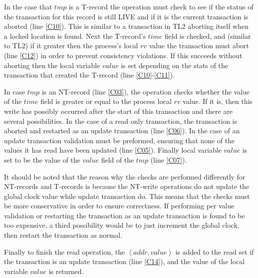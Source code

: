 \documentclass[runningheads,a4paper]{llncs}
\newcommand{\tuple}[1]{\ensuremath{\left \langle #1 \right \rangle }}
\begin{document}
In the case that $\mathit{tmp}$ is a T-record the operation must check to see
if the status of the transaction for this record is still LIVE and if it is
the current transaction is aborted (line \ref{C10}).
This is similar to a transaction in TL2 aborting itself when a locked location is found.
Next the T-record's $\mathit{time}$ field is checked, and (similar to TL2) if it 
greater then the process's local $\mathit{rv}$ value the transaction must abort 
(line \ref{C12}) in order to prevent consistency violations.
If this succeeds without aborting then the local variable $\mathit{value}$
is set depending on the stats of the transaction that created the T-record (line \ref{C10}-\ref{C11}).

In case $\mathit{tmp}$ is an 
NT-record (line \ref{C03}), the operation
checks whether the value of the $\mathit{time}$ field is
greater or equal to the process local $\mathit{rv}$ value.
If it is, then this write has possibly occurred after the start of this
transaction and there are several possibilities.
In the case of a read only transaction, the transaction
is aborted and restarted as an update transaction (line \ref{C06}).
In the case of an update transaction validation must be preformed, ensuring
that none of the values it has read have been updated (line \ref{C05}).
Finally local variable $\mathit{value}$ is set to be the value
of the $\mathit{value}$ field of the $\mathit{tmp}$ (line \ref{C07}).

It should be noted that the reason why the checks are performed differently
for NT-records and T-records is because the NT-write operations do not
update the global clock value while update transaction do.
This means that the checks must be more conservative in order to ensure correctness.
If performing per value validation or restarting the transaction as an update transaction
is found to be too expensive, a third possibility would be to just increment the global
clock, then restart the transaction as normal.

Finally to finish the read operation, the $\tuple{\mathit{addr, value}}$
is added to the read set if the transaction is an update transaction (line \ref{C14}),
and the value of the local variable $\mathit{value}$  is returned.
\end{document}
